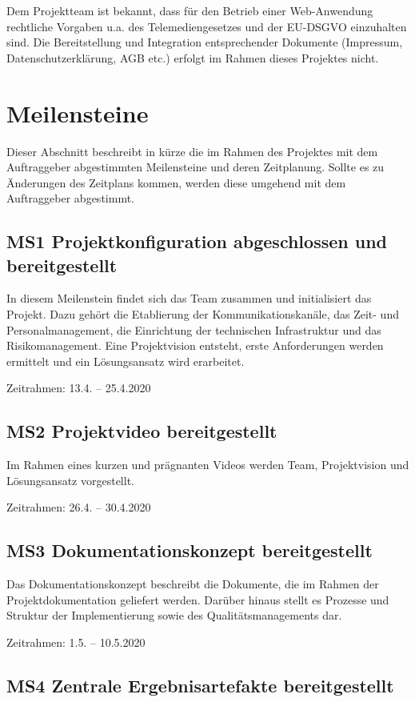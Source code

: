 \documentclass[a4paper,11pt,listof=numbered,glossary=totoc,parskip=half]{scrreprt}
\begin{document}
Dem Projektteam ist bekannt, dass für den Betrieb einer Web-Anwendung rechtliche Vorgaben u.a. des Telemediengesetzes und der EU-DSGVO einzuhalten sind. Die Bereitstellung und Integration entsprechender Dokumente (Impressum, Datenschutzerklärung, AGB etc.) erfolgt im Rahmen dieses Projektes nicht.	
	
	\newpage
	\section{Meilensteine}
Dieser Abschnitt beschreibt in kürze die im Rahmen des Projektes mit dem Auftraggeber abgestimmten Meilensteine und deren Zeitplanung.
Sollte es zu Änderungen des Zeitplans kommen, werden diese umgehend mit dem Auftraggeber abgestimmt.

\subsection{MS1 Projektkonfiguration abgeschlossen und bereitgestellt}

In diesem Meilenstein findet sich das Team zusammen und initialisiert das Projekt. 
Dazu gehört die Etablierung der Kommunikationskanäle, das Zeit- und Personalmanagement, die Einrichtung der technischen Infrastruktur und das Risikomanagement.
Eine Projektvision entsteht, erste Anforderungen werden ermittelt und ein Lösungsansatz wird erarbeitet.

Zeitrahmen: 13.4. -- 25.4.2020


\subsection{MS2 Projektvideo bereitgestellt}

Im Rahmen eines kurzen und prägnanten Videos werden Team, Projektvision und Lösungsansatz vorgestellt.

Zeitrahmen: 26.4. -- 30.4.2020

\subsection{MS3 Dokumentationskonzept bereitgestellt}

Das Dokumentationskonzept beschreibt die Dokumente, die im Rahmen der Projektdokumentation geliefert werden. Darüber hinaus stellt es Prozesse und Struktur der Implementierung sowie des Qualitätsmanagements dar.

Zeitrahmen: 1.5. -- 10.5.2020

\subsection{MS4 Zentrale Ergebnisartefakte bereitgestellt}
\end{document}
